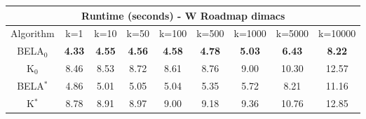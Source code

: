 \begin{tabular}{c|cccccccc}\toprule
\multicolumn{9}{c}{Runtime (seconds) - W Roadmap dimacs}\\ \midrule
Algorithm & k=1 & k=10 & k=50 & k=100 & k=500 & k=1000 & k=5000 & k=10000 \\ \midrule
BELA$_0$ & \textbf{4.33} & \textbf{4.55} & \textbf{4.56} & \textbf{4.58} & \textbf{4.78} & \textbf{5.03} & \textbf{6.43} & \textbf{8.22} \\
K$_0$ & 8.46 & 8.53 & 8.72 & 8.61 & 8.76 & 9.00 & 10.30 & 12.57 \\
BELA$^*$ & 4.86 & 5.01 & 5.05 & 5.04 & 5.35 & 5.72 & 8.21 & 11.16 \\
K$^*$ & 8.78 & 8.91 & 8.97 & 9.00 & 9.18 & 9.36 & 10.76 & 12.85 \\ \bottomrule 
\end{tabular}
